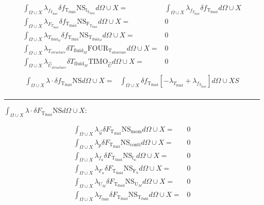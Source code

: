 \documentclass[10pt]{article} %
\begin{document}
\begin{center}
\begin{align*}
	\int_{\Omega \cup X} \lambda_{f_{T_{\text{fluid}}}} \delta f_{\text{T}_{\text{fluid}}} \text{NS}_{\text{f}_{\text{T}_{\text{fluid}}}} d\Omega \cup X =& \int_{\Omega \cup X} \lambda_{f_{T_{\text{fluid}}}} \delta f_{\text{T}_{\text{fluid}}}d\Omega \cup X\\
	\int_{\Omega \cup X} \lambda_{F_{T_{\text{fluid}}}} \delta f_{\text{T}_{\text{fluid}}} \text{NS}_{\text{F}_{\text{T}_{\text{fluid}}}} d\Omega \cup X =& 0\\
	\int_{\Omega \cup X} \lambda_{T_{\text{fluid}_M}} \delta f_{\text{T}_{\text{fluid}}} \text{NS}_{\text{T}_{\text{fluid}_M}} d\Omega \cup X =& 0\\
	\int_{\Omega \cup X} \lambda_{T_{structure}} \delta T_{\text{fluid}_M} \text{FOUR}_{\text{T}_{\text{structure}}} d\Omega \cup X =& 0\\
	\int_{\Omega \cup X} \lambda_{\vec{U}_{structure}} \delta T_{\text{fluid}_M} \text{TIMO}_{\vec{U}} d\Omega \cup X =& 0\\
\end{align*}
\begin{align*}
	\int_{\Omega \cup X} \lambda \cdot \delta f_{\text{T}_{\text{fluid}}} \text{NS}d\Omega \cup X 
	=&\int_{\Omega \cup X} \delta f_{\text{T}_{\text{fluid}}} \left[ - \lambda_{T_{\text{fluid}}} +\lambda_{f_{T_{\text{fluid}}}}\right] d\Omega \cup XS\\
\end{align*}
\noindent\rule[1ex]{\textwidth}{1pt}
\begin{flushleft}
	$\int_{\Omega \cup X} \lambda \cdot \delta F_{\text{T}_{\text{fluid}}} \text{NS}d\Omega \cup X :$
\end{flushleft}
\begin{align*}
	\int_{\Omega \cup X} \lambda_{\vec{u}} \delta F_{\text{T}_{\text{fluid}}} \text{NS}_{\text{mom}} d\Omega \cup X =& 0\\
	\int_{\Omega \cup X} \lambda_p \delta F_{\text{T}_{\text{fluid}}} \text{NS}_{\text{conti}} d\Omega \cup X =& 0\\
	\int_{\Omega \cup X} \lambda_{f_u} \delta F_{\text{T}_{\text{fluid}}} \text{NS}_{\text{f}_u} d\Omega \cup X =& 0\\
	\int_{\Omega \cup X} \lambda_{F_u} \delta F_{\text{T}_{\text{fluid}}} \text{NS}_{\text{F}_u} d\Omega \cup X =& 0\\
	\int_{\Omega \cup X} \lambda_{U_M} \delta F_{\text{T}_{\text{fluid}}} \text{NS}_{\text{U}_M} d\Omega \cup X =& 0\\
	\int_{\Omega \cup X} \lambda_{T_{\text{fluid}}} \delta F_{\text{T}_{\text{fluid}}} \text{NS}_{\text{T}_{\text{fluid}}} d\Omega \cup X =& 0\\

\end{align*}
\end{center}
\end{document}
